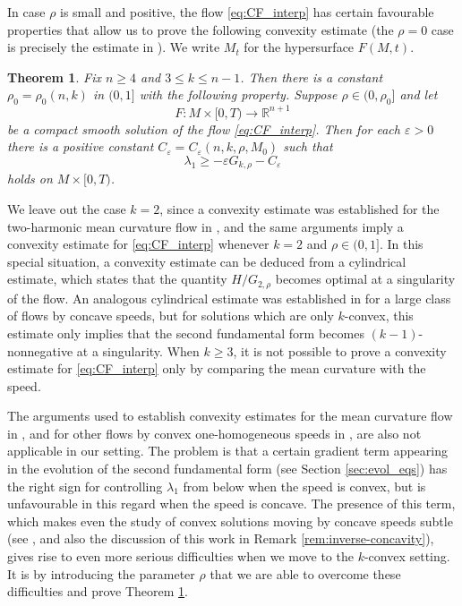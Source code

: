 \documentclass[12pt]{amsart}
\newtheorem{theorem}{Theorem}[section]
\begin{document}
In case $\rho$ is small and positive, the flow \eqref{eq:CF_interp} has certain favourable properties that allow us to prove the following convexity estimate (the $\rho = 0$ case is precisely the estimate in \cite{Huisk-Sin99}). We write $M_t$ for the hypersurface $F(M,t)$. 

\begin{theorem}
\label{thm:conv_est_intro}
Fix $n \geq 4$ and $3 \leq k \leq n-1$. Then there is a constant $\rho_0 = \rho_0(n,k)$ in $(0,1]$ with the following property. Suppose $\rho \in (0,\rho_0]$ and let 
\[F: M\times [0,T) \to \mathbb{R}^{n+1}\]
be a compact smooth solution of the flow \eqref{eq:CF_interp}. Then for each $\varepsilon >0$ there is a positive constant $C_\varepsilon = C_\varepsilon(n, k, \rho, M_0)$ such that 
\[\lambda_1 \geq -\varepsilon G_{k,\rho} - C_\varepsilon\]
holds on $ M\times [0,T)$. 
\end{theorem}

We leave out the case $k=2$, since a convexity estimate was established for the two-harmonic mean curvature flow in \cite{Bren-Huisk17}, and the same arguments imply a convexity estimate for \eqref{eq:CF_interp} whenever $k=2$ and $\rho \in (0,1]$. In this special situation, a convexity estimate can be deduced from a cylindrical estimate, which states that the quantity $H/G_{2,\rho}$ becomes optimal at a singularity of the flow. An analogous cylindrical estimate was established in \cite{Lang-Lyn19} for a large class of flows by concave speeds, but for solutions which are only $k$-convex, this estimate only implies that the second fundamental form becomes $(k-1)$-nonnegative at a singularity. When $k \geq 3$, it is not possible to prove a convexity estimate for \eqref{eq:CF_interp} only by comparing the mean curvature with the speed. 

The arguments used to establish convexity estimates for the mean curvature flow in \cite{Huisk-Sin99}, and for other flows by convex one-homogeneous speeds in \cite{ALM14}, are also not applicable in our setting. The problem is that a certain gradient term appearing in the evolution of the second fundamental form (see Section \ref{sec:evol_eqs}) has the right sign for controlling $\lambda_1$ from below when the speed is convex, but is unfavourable in this regard when the speed is concave. The presence of this term, which makes even the study of convex solutions moving by concave speeds subtle (see \cite{And07}, and also the discussion of this work in Remark \ref{rem:inverse-concavity}), gives rise to even more serious difficulties when we move to the $k$-convex setting. It is by introducing the parameter $\rho$ that we are able to overcome these difficulties and prove Theorem \ref{thm:conv_est_intro}.
\end{document}
